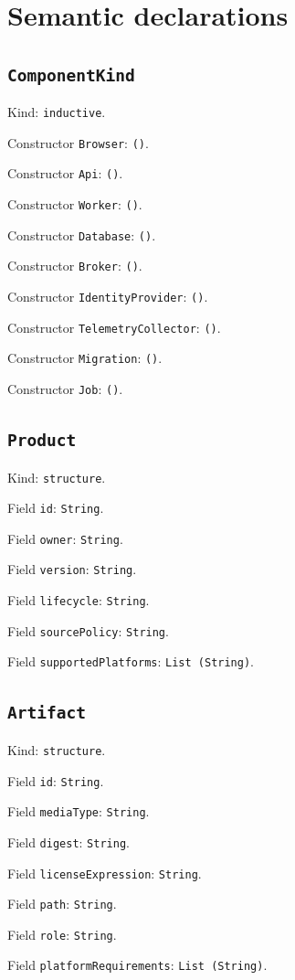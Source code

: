 \documentclass[11pt]{article}
\begin{document}
\section*{Semantic declarations}
\subsection*{\texttt{ComponentKind}}
\noindent Kind: \texttt{inductive}.\par
\noindent Constructor \texttt{Browser}: \texttt{()}.\par
\noindent Constructor \texttt{Api}: \texttt{()}.\par
\noindent Constructor \texttt{Worker}: \texttt{()}.\par
\noindent Constructor \texttt{Database}: \texttt{()}.\par
\noindent Constructor \texttt{Broker}: \texttt{()}.\par
\noindent Constructor \texttt{IdentityProvider}: \texttt{()}.\par
\noindent Constructor \texttt{TelemetryCollector}: \texttt{()}.\par
\noindent Constructor \texttt{Migration}: \texttt{()}.\par
\noindent Constructor \texttt{Job}: \texttt{()}.\par
\subsection*{\texttt{Product}}
\noindent Kind: \texttt{structure}.\par
\noindent Field \texttt{id}: \texttt{String}.\par
\noindent Field \texttt{owner}: \texttt{String}.\par
\noindent Field \texttt{version}: \texttt{String}.\par
\noindent Field \texttt{lifecycle}: \texttt{String}.\par
\noindent Field \texttt{sourcePolicy}: \texttt{String}.\par
\noindent Field \texttt{supportedPlatforms}: \texttt{List (String)}.\par
\subsection*{\texttt{Artifact}}
\noindent Kind: \texttt{structure}.\par
\noindent Field \texttt{id}: \texttt{String}.\par
\noindent Field \texttt{mediaType}: \texttt{String}.\par
\noindent Field \texttt{digest}: \texttt{String}.\par
\noindent Field \texttt{licenseExpression}: \texttt{String}.\par
\noindent Field \texttt{path}: \texttt{String}.\par
\noindent Field \texttt{role}: \texttt{String}.\par
\noindent Field \texttt{platformRequirements}: \texttt{List (String)}.\par
\end{document}

